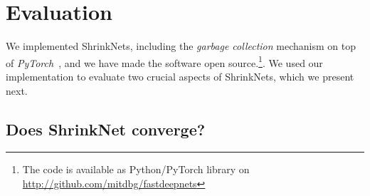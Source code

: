 \documentclass[sigconf]{acmart}
\newcommand{\gl}[1]{\textcolor{violet}{{\bf Gl:} #1}}
\begin{document}
\section{Evaluation}

We  implemented ShrinkNets, including the \emph{garbage collection}
mechanism on top of \textit{PyTorch}~\cite{paszke2017automatic}, and we have
made the software open source.\footnote{The code is available as Python/PyTorch
library on \url{http://github.com/mitdbg/fastdeepnets}
}. We used our implementation to evaluate two crucial aspects of
ShrinkNets, which we present next.


%


\subsection{Does ShrinkNet converge?}
\end{document}
